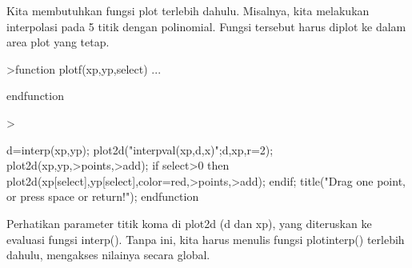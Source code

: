 \documentclass[a4paper,10pt]{article}
\begin{document}
\begin{eulernotebook}
\begin{eulercomment}
\begin{eulercomment}
\begin{eulercomment}
\begin{eulercomment}
\begin{eulercomment}
\begin{eulercomment}
\begin{eulercomment}
\begin{eulercomment}
\begin{eulercomment}
\begin{eulercomment}
\begin{eulercomment}
\begin{eulercomment}
\begin{eulercomment}
\begin{eulercomment}
\begin{eulercomment}
\begin{eulercomment}
\begin{eulercomment}
\begin{eulercomment}
\begin{eulercomment}
\begin{eulercomment}
\begin{eulercomment}
\begin{eulercomment}
\begin{eulercomment}
\begin{eulercomment}
\begin{eulercomment}
\begin{eulercomment}
\begin{eulercomment}
\begin{eulercomment}
\begin{eulercomment}
\begin{eulercomment}
\begin{eulercomment}
\begin{eulercomment}
\begin{eulercomment}
\begin{eulercomment}
\begin{eulercomment}
\begin{eulercomment}
\begin{eulercomment}
Kita membutuhkan fungsi plot terlebih dahulu. Misalnya, kita melakukan
interpolasi pada 5 titik dengan polinomial. Fungsi tersebut harus
diplot ke dalam area plot yang tetap.
\end{eulercomment}
\begin{eulerprompt}
>function plotf(xp,yp,select) ...
\end{eulerprompt}
\begin{eulerudf}
  endfunction
\end{eulerudf}
\begin{eulerprompt}
>                 
\end{eulerprompt}
\begin{eulerudf}
   d=interp(xp,yp);
    plot2d("interpval(xp,d,x)";d,xp,r=2);
    plot2d(xp,yp,>points,>add);
    if select>0 then
      plot2d(xp[select],yp[select],color=red,>points,>add);
    endif;
    title("Drag one point, or press space or return!");
  endfunction
\end{eulerudf}
\begin{eulercomment}
Perhatikan parameter titik koma di plot2d (d dan xp), yang diteruskan
ke evaluasi fungsi interp(). Tanpa ini, kita harus menulis fungsi
plotinterp() terlebih dahulu, mengakses nilainya secara global.


\end{eulercomment}
\end{eulercomment}
\end{eulercomment}
\end{eulercomment}
\end{eulercomment}
\end{eulercomment}
\end{eulercomment}
\end{eulercomment}
\end{eulercomment}
\end{eulercomment}
\end{eulercomment}
\end{eulercomment}
\end{eulercomment}
\end{eulercomment}
\end{eulercomment}
\end{eulercomment}
\end{eulercomment}
\end{eulercomment}
\end{eulercomment}
\end{eulercomment}
\end{eulercomment}
\end{eulercomment}
\end{eulercomment}
\end{eulercomment}
\end{eulercomment}
\end{eulercomment}
\end{eulercomment}
\end{eulercomment}
\end{eulercomment}
\end{eulercomment}
\end{eulercomment}
\end{eulercomment}
\end{eulercomment}
\end{eulercomment}
\end{eulercomment}
\end{eulercomment}
\end{eulercomment}
\end{eulernotebook}
\end{document}
